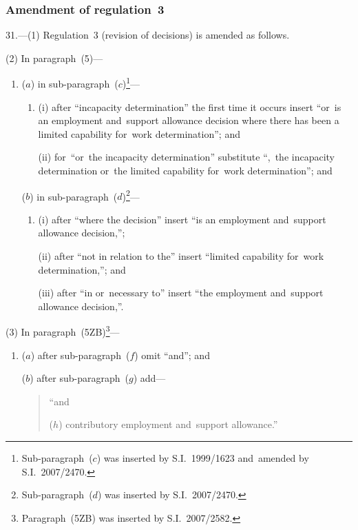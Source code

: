 \documentclass[12pt,a4paper]{article}
\begin{document}
\subsubsection[31. Amendment of regulation~3]{Amendment of regulation~3}

31.---(1)  Regulation~3 (revision of decisions) is amended as follows.

(2) In paragraph~(5)—
\begin{enumerate}\item[]
($a$) in sub-paragraph~($c$)\footnote{Sub-paragraph~($c$) was inserted by S.I.~1999/1623 and~amended by S.I.~2007/2470.}—
\begin{enumerate}\item[]
(i) after “incapacity determination” the first time it occurs insert “or~is an employment and~support allowance decision where there has been a limited capability for~work determination”; and

(ii) for~“or~the incapacity determination” substitute “,~the incapacity determination or~the limited capability for~work determination”; and
\end{enumerate}

($b$) in sub-paragraph~($d$)\footnote{Sub-paragraph~($d$) was inserted by S.I.~2007/2470.}—
\begin{enumerate}\item[]
(i) after “where the decision” insert “is an employment and~support allowance decision,”;

(ii) after “not in relation to the” insert “limited capability for~work determination,”; and

(iii) after “in or~necessary to” insert “the employment and~support allowance decision,”.
\end{enumerate}
\end{enumerate}

(3) In paragraph~(5ZB)\footnote{Paragraph~(5ZB) was inserted by S.I.~2007/2582.}—
\begin{enumerate}\item[]
($a$) after sub-paragraph~($f$)  omit “and”; and

($b$) after sub-paragraph~($g$)  add—
\begin{quotation}
“and

($h$) contributory employment and~support allowance.”
\end{quotation}
\end{enumerate}
\end{document}
